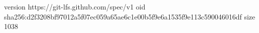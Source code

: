 version https://git-lfs.github.com/spec/v1
oid sha256:d2f3208bf97012a5f07ec059a65ae6c1e00b5f9e6a1535f9e113c590046016df
size 1038
